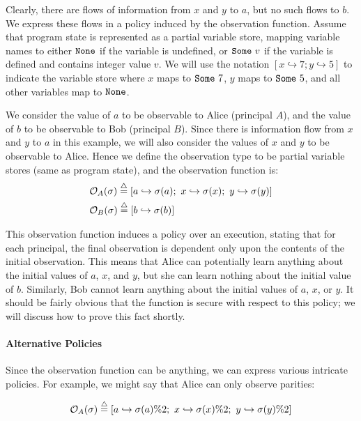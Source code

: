 \noindent{}Clearly, there are flows of information from $x$ and $y$ to $a$, but no
such flows to $b$. We express these flows in a policy induced by the observation
function. Assume that program state is represented as a partial variable store,
mapping variable names to either $\text{\tt{None}}{}$ if the variable is undefined,
or $\text{\tt{Some}} \,\, v$ if the variable is defined and contains integer value $v$.
We will use the notation $[x \hookrightarrow 7; y \hookrightarrow 5]$ to
indicate the variable store where $x$ maps to $\text{\tt{Some}} \,\, 7$, $y$ maps to
$\text{\tt{Some}} \,\, 5$, and all other variables map to $\text{\tt{None}}{}$.

We consider the value of $a$ to be observable to Alice (principal $A$), and 
the value of $b$ to be observable 
to Bob (principal $B$). Since there is information flow from $x$ and $y$ to
$a$ in this example, we will also consider the values of $x$ and $y$ to be 
observable to Alice. 
Hence we define the observation type to be partial variable stores (same as
program state), and the observation function is:
{\small\begin{align*}
  & \mathcal{O}_{A}(\sigma) \stackrel{\triangle}{=} 
[a \hookrightarrow \sigma(a); \,\, x \hookrightarrow \sigma(x); \,\, y \hookrightarrow \sigma(y)] \\
& \mathcal{O}_{B}(\sigma) \stackrel{\triangle}{=} 
[b \hookrightarrow \sigma(b)]
\end{align*}}%

\noindent{}This observation function induces a policy over an execution, stating that 
for each principal, the final observation is dependent only upon the contents
of the initial observation.
This means that Alice can potentially learn anything about the initial values 
of $a$, $x$, and $y$, but she can learn nothing about the initial value 
of $b$. Similarly, Bob cannot learn anything about the initial values 
of $a$, $x$, or $y$. It should be fairly obvious that
the  function is secure with respect to this policy; we will
discuss how to prove this fact shortly.

\paragraph{Alternative Policies}
Since the observation function can be anything, we can express various
intricate policies. For example, we might say that Alice can only observe
parities:

{\small\[\mathcal{O}_{A}(\sigma) \stackrel{\triangle}{=} 
[a \hookrightarrow \sigma(a)\%2; \,\, x \hookrightarrow \sigma(x)\%2; 
  \,\, y \hookrightarrow \sigma(y)\%2]\]}%


